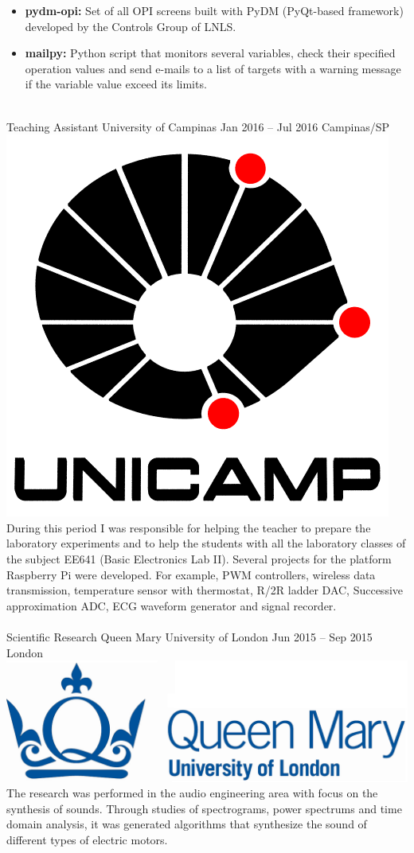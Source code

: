 \documentclass[
	a4paper,
]{fortysecondscv}
\newcommand{\profiledivider}{\textcolor{body!30}{\hdashrule{\linewidth}{0.6pt}{0.5ex}}\\}
\begin{document}
{\begin{itemize}
            \item {} \hspace{0.5mm} \textbf{pydm-opi:} Set of all OPI screens built with PyDM (PyQt-based framework) developed by the Controls Group of LNLS.
            \item {} \hspace{0.5mm} \textbf{mailpy:} Python script that monitors several variables, check their specified operation values and send e-mails to a list of targets with a warning message if the variable value exceed its limits.
        \end{itemize}
        }
    \profiledivider
    \vspace{-2.2mm}
    \cvevent
        {Teaching Assistant}
        {University of Campinas}
        {Jan 2016 -- Jul 2016}
        {Campinas/SP}
        {\hspace{2mm}\includegraphics[height=0.07\textwidth]{Unicamp}}
        {During this period I was responsible for helping the teacher to prepare the laboratory experiments and to help the students with all the laboratory classes of the subject EE641 (Basic Electronics Lab II). Several projects for the platform Raspberry Pi were developed. For example, PWM controllers, wireless data transmission, temperature sensor with thermostat, R/2R ladder DAC, Successive approximation ADC, ECG waveform generator and signal recorder.}
    \\\profiledivider
    \vspace{-2.2mm}
    \cvevent
        {Scientific Research}
        {Queen Mary University of London}
        {Jun 2015 -- Sep 2015}
        {London}
        {\hspace{2mm}\includegraphics[height=0.05\textwidth]{QMUL}}
        {The research was performed in the audio engineering area with focus on the synthesis of sounds. Through studies of spectrograms, power spectrums and time domain analysis, it was generated algorithms that synthesize the sound of different types of electric motors.}
\end{document}
